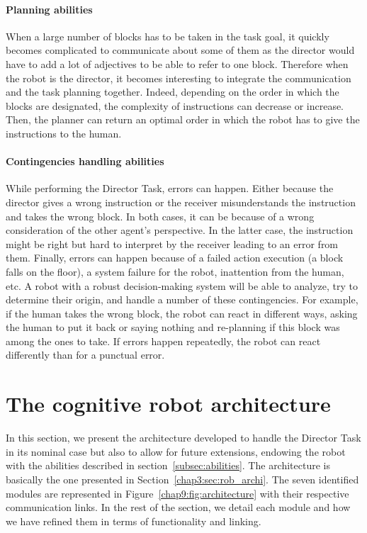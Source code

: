 \documentclass[a4paper,11pt,twoside]{StyleThese}
\begin{document}
\paragraph{Planning abilities} When a large number of blocks has to be taken in the task goal, it quickly becomes complicated to communicate about some of them as the director would have to add a lot of adjectives to be able to refer to one block. Therefore when the robot is the director, it becomes interesting to integrate the communication and the task planning together. Indeed, depending on the order in which the blocks are designated, the complexity of instructions can decrease or increase. Then, the planner can return an optimal order in which the robot has to give the instructions to the human.

\paragraph{Contingencies handling abilities} While performing the Director Task, errors can happen. Either because the director gives a wrong instruction or the receiver misunderstands the instruction and takes the wrong block. In both cases, it can be because of a wrong consideration of the other agent's perspective. In the latter case, the instruction might be right but hard to interpret by the receiver leading to an error from them. Finally, errors can happen because of a failed action execution (\eg a block falls on the floor), a system failure for the robot, inattention from the human, etc. A robot with a robust decision-making system will be able to analyze, try to determine their origin, and handle a number of these contingencies. For example, if the human takes the wrong block, the robot can react in different ways, \eg asking the human to put it back or saying nothing and re-planning if this block was among the ones to take. If errors happen repeatedly, the robot can react differently than for a punctual error.


\section{The cognitive robot architecture}
\label{chap9:sec:archi}

In this section, we present the architecture developed to handle the Director Task in its nominal case but also to allow for future extensions, endowing the robot with the abilities described in section~\ref{subsec:abilities}. The architecture is basically the one presented in Section~\ref{chap3:sec:rob_archi}.
The seven identified modules are represented in Figure~\ref{chap9:fig:architecture} with their respective communication links. In the rest of the section, we detail each module and how we have refined them in terms of functionality and linking.
\end{document}

